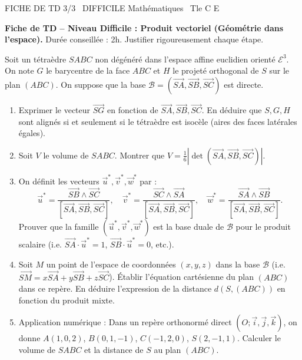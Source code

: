 \documentclass[11pt]{article}
\begin{document}
\begin{tcolorbox}[enhanced,colback=popink,colframe=popink,arc=10pt,boxrule=0pt,left=12pt,right=12pt,top=9pt,bottom=9pt]
{\color{white}\popxbold\small FICHE DE TD 3/3 \textbullet\ DIFFICILE \hfill Mathématiques \textbullet\ Tle C E\par}
\end{tcolorbox}
\vspace{4pt}
\noindent \textbf{Fiche de TD -- Niveau Difficile : Produit vectoriel (Géométrie dans l'espace).} Durée conseillée : 2h. Justifier rigoureusement chaque étape.

\begin{exercice}
Soit un tétraèdre $SABC$ non dégénéré dans l'espace affine euclidien orienté $\mathcal{E}^3$. On note $G$ le barycentre de la face $ABC$ et $H$ le projeté orthogonal de $S$ sur le plan $(ABC)$. On suppose que la base $\mathcal{B}=(\overrightarrow{SA},\overrightarrow{SB},\overrightarrow{SC})$ est directe.
\begin{enumerate}
    \item Exprimer le vecteur $\overrightarrow{SG}$ en fonction de $\overrightarrow{SA},\overrightarrow{SB},\overrightarrow{SC}$. En déduire que $S,G,H$ sont alignés si et seulement si le tétraèdre est isocèle (aires des faces latérales égales).
    \item Soit $V$ le volume de $SABC$. Montrer que $V = \frac{1}{6}\left| \det(\overrightarrow{SA},\overrightarrow{SB},\overrightarrow{SC}) \right|$.
    \item On définit les vecteurs $\vec{u}^*,\vec{v}^*,\vec{w}^*$ par :
    \[
    \vec{u}^* = \frac{\overrightarrow{SB}\wedge\overrightarrow{SC}}{[\overrightarrow{SA},\overrightarrow{SB},\overrightarrow{SC}]},\quad
    \vec{v}^* = \frac{\overrightarrow{SC}\wedge\overrightarrow{SA}}{[\overrightarrow{SA},\overrightarrow{SB},\overrightarrow{SC}]},\quad
    \vec{w}^* = \frac{\overrightarrow{SA}\wedge\overrightarrow{SB}}{[\overrightarrow{SA},\overrightarrow{SB},\overrightarrow{SC}]}.
    \]
    Prouver que la famille $(\vec{u}^*,\vec{v}^*,\vec{w}^*)$ est la base duale de $\mathcal{B}$ pour le produit scalaire (i.e. $\overrightarrow{SA}\cdot\vec{u}^*=1$, $\overrightarrow{SB}\cdot\vec{u}^*=0$, etc.).
    \item Soit $M$ un point de l'espace de coordonnées $(x,y,z)$ dans la base $\mathcal{B}$ (i.e. $\overrightarrow{SM}=x\overrightarrow{SA}+y\overrightarrow{SB}+z\overrightarrow{SC}$). Établir l'équation cartésienne du plan $(ABC)$ dans ce repère. En déduire l'expression de la distance $d(S,(ABC))$ en fonction du produit mixte.
    \item Application numérique : Dans un repère orthonormé direct $(O;\vec{i},\vec{j},\vec{k})$, on donne $A(1,0,2)$, $B(0,1,-1)$, $C(-1,2,0)$, $S(2,-1,1)$. Calculer le volume de $SABC$ et la distance de $S$ au plan $(ABC)$.
\end{enumerate}
\end{exercice}
\end{document}
